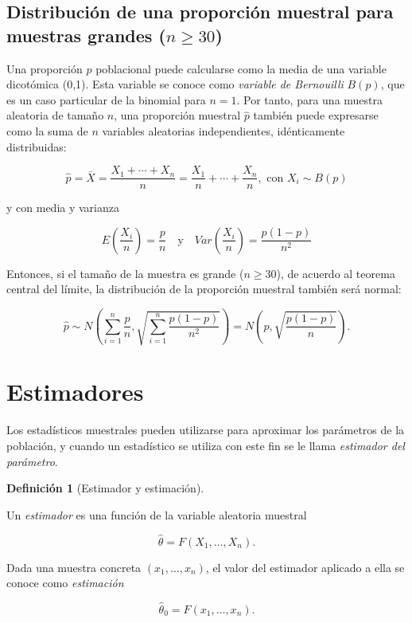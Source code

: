 \documentclass[
  a4paper,
]{scrreport}
\theoremstyle{plain}
\theoremstyle{definition}
\theoremstyle{definition}
\newtheorem{definition}{Definición}[chapter]
\theoremstyle{remark}
\begin{document}
\subsection{\texorpdfstring{Distribución de una proporción muestral para
muestras grandes
(\(n\geq 30\))}{Distribución de una proporción muestral para muestras grandes (n\textbackslash geq 30)}}\label{distribuciuxf3n-de-una-proporciuxf3n-muestral-para-muestras-grandes-ngeq-30}

Una proporción \(p\) poblacional puede calcularse como la media de una
variable dicotómica (0,1). Esta variable se conoce como \emph{variable
de Bernouilli} \(B(p)\), que es un caso particular de la binomial para
\(n=1\). Por tanto, para una muestra aleatoria de tamaño \(n\), una
proporción muestral \(\hat p\) también puede expresarse como la suma de
\(n\) variables aleatorias independientes, idénticamente distribuidas:

\[
\hat p = \bar X = \frac{X_1+\cdots+X_n}{n} = \frac{X_1}{n}+\cdots+\frac{X_n}{n}, \mbox{ con } X_i\sim B(p)
\]

y con media y varianza

\[
E\left(\frac{X_i}{n}\right) =\frac{p}{n} \quad  \mbox{y} \quad Var\left(\frac{X_i}{n}\right) = \frac{p(1-p)}{n^2}
\]

Entonces, si el tamaño de la muestra es grande (\(n\geq 30\)), de
acuerdo al teorema central del límite, la distribución de la proporción
muestral también será normal:

\[
\hat p \sim N\left(\sum_{i=1}^n \frac{p}{n},\sqrt{\sum_{i=1}^n \frac{p(1-p)}{n^2}} \right) = N\left(p,\sqrt{\frac{p(1-p)}{n}} \right).
\]

\section{Estimadores}\label{estimadores}

Los estadísticos muestrales pueden utilizarse para aproximar los
parámetros de la población, y cuando un estadístico se utiliza con este
fin se le llama \emph{estimador del parámetro}.

\begin{definition}[Estimador y
estimación]\protect\hypertarget{def-estimador-estimacion}{}\label{def-estimador-estimacion}

Un \emph{estimador} es una función de la variable aleatoria muestral

\[
\hat \theta = F(X_1,\ldots,X_n).
\]

Dada una muestra concreta \((x_1,\ldots,x_n)\), el valor del estimador
aplicado a ella se conoce como \emph{estimación}

\[
\hat \theta_0 = F(x_1,\ldots,x_n).
\]

\end{definition}
\end{document}
